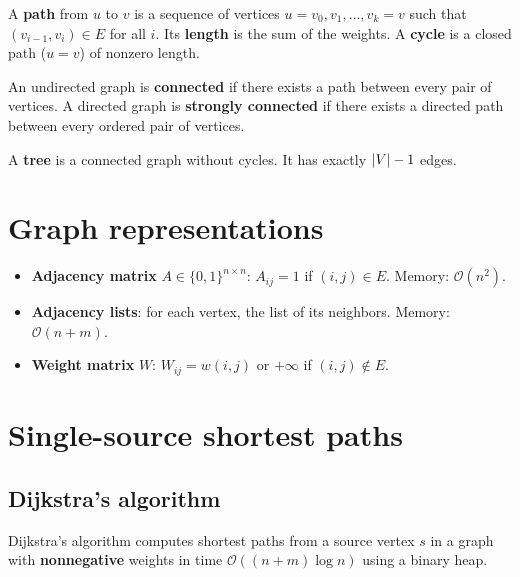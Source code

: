 \begin{definition}
A \textbf{path} from $u$ to $v$ is a sequence of vertices
$u = v_0, v_1, \ldots, v_k = v$ such that $(v_{i-1}, v_i) \in E$ for all $i$.
Its \textbf{length} is the sum of the weights. A \textbf{cycle} is a closed
path ($u = v$) of nonzero length.
\end{definition}

\begin{definition}
An undirected graph is \textbf{connected} if there exists a path between every
pair of vertices. A directed graph is \textbf{strongly connected} if there
exists a directed path between every ordered pair of vertices.
\end{definition}

\begin{definition}[Tree]
A \textbf{tree} is a connected graph without cycles. It has exactly
$\left| V \right| - 1$ edges.
\end{definition}

\section{Graph representations}

\begin{keyformulas}[title=\textbf{Data structures}]
\begin{itemize}
  \item \textbf{Adjacency matrix} $A \in \{0,1\}^{n \times n}$:
        $A_{ij} = 1$ if $(i,j) \in E$. Memory: $\mathcal{O}(n^2)$.
  \item \textbf{Adjacency lists}: for each vertex, the list of its neighbors.
        Memory: $\mathcal{O}(n + m)$.
  \item \textbf{Weight matrix} $W$: $W_{ij} = w(i,j)$ or $+\infty$ if
        $(i,j) \notin E$.
\end{itemize}
\end{keyformulas}

\section{Single-source shortest paths}

\subsection{Dijkstra's algorithm}

\begin{theorem}
Dijkstra's algorithm computes shortest paths from a source vertex $s$ in a
graph with \textbf{nonnegative} weights in time $\mathcal{O}((n + m) \log n)$
using a binary heap.
\end{theorem}

